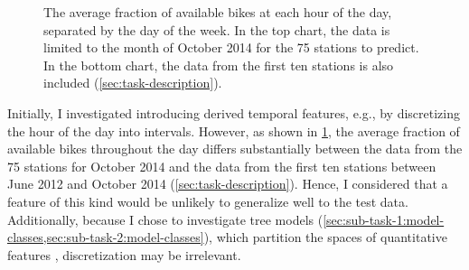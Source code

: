 \begin{figure}[!ht]
	\centering
	
	\caption{
		The average fraction of available bikes at each hour of the day, separated by the day of the week.
		In the top chart, the data is limited to the month of October 2014 for the 75 stations
		to predict.
		In the bottom chart, the data from the first ten stations is also included
		(\cref{sec:task-description}).
	}
	\label{fig-weekday}
\end{figure}

Initially, I investigated introducing derived temporal features, e.g., by discretizing
the hour of the day into intervals.
However, as shown in \cref{fig-weekday}, the average fraction of available bikes
throughout the day differs substantially between the data from the 75 stations for
October 2014 and the data from the first ten stations between June 2012 and October
2014 (\cref{sec:task-description}).
Hence, I considered that a feature of this kind would be unlikely to generalize well to
the test data.
Additionally, because I chose to investigate tree models
(\cref{sec:sub-task-1:model-classes,sec:sub-task-2:model-classes}), which partition the
spaces of quantitative features \parencite[155]{Flach2012}, discretization may be
irrelevant.
